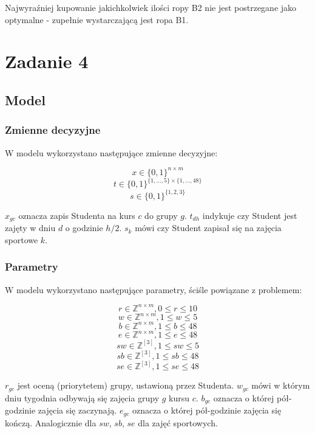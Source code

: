 \documentclass{article}
\theoremstyle{definition}
\theoremstyle{remark}
\theoremstyle{plain}
\theoremstyle{remark}
\theoremstyle{plain}
\begin{document}
Najwyraźniej kupowanie jakichkolwiek ilości ropy B2 nie jest postrzegane jako optymalne - zupełnie wystarczającą jest ropa B1.

\section{Zadanie 4}
\subsection{Model}
\subsubsection{Zmienne decyzyjne}
W modelu wykorzystano następujące zmienne decyzyjne:

\[ x \in \{0,1\}^{n\times m} \]
\[ t \in \{0,1\}^{\{1,\ldots,5\}\times \{1,\ldots,48\}} \]
\[ s \in \{0,1\}^{\{1,2,3\}} \]

$x_{gc}$ oznacza zapis Studenta na kurs $c$ do grupy $g$. 
$t_{dh}$ indykuje czy Student jest zajęty w dniu $d$ o godzinie $h/2$.
$s_k$ mówi czy Student zapisał się na zajęcia sportowe $k$.

\subsubsection{Parametry}
W modelu wykorzystano następujące parametry, ściśle powiązane z problemem:

\[ r \in \mathbb{Z}^{n\times m}, 0 \leq r \leq 10 \]
\[ w \in \mathbb{Z}^{n\times m}, 1 \leq w \leq 5 \]
\[ b \in \mathbb{Z}^{n\times m}, 1 \leq b \leq 48 \]
\[ e \in \mathbb{Z}^{n\times m}, 1 \leq e \leq 48 \]
\[ sw \in \mathbb{Z}^{[3]}, 1 \leq sw \leq 5 \]
\[ sb \in \mathbb{Z}^{[3]}, 1 \leq sb \leq 48 \]
\[ se \in \mathbb{Z}^{[3]}, 1 \leq se \leq 48 \]

$r_{gc}$ jest oceną (priorytetem) grupy, ustawioną przez Studenta. 
$w_{gc}$ mówi w którym dniu tygodnia odbywają się zajęcia grupy $g$ kursu $c$.
$b_{gc}$ oznacza o której pół-godzinie zajęcia się zaczynają.
$e_{gc}$ oznacza o której pół-godzinie zajęcia się kończą.
Analogicznie dla $sw$, $sb$, $se$ dla zajęć sportowych.
\end{document}
